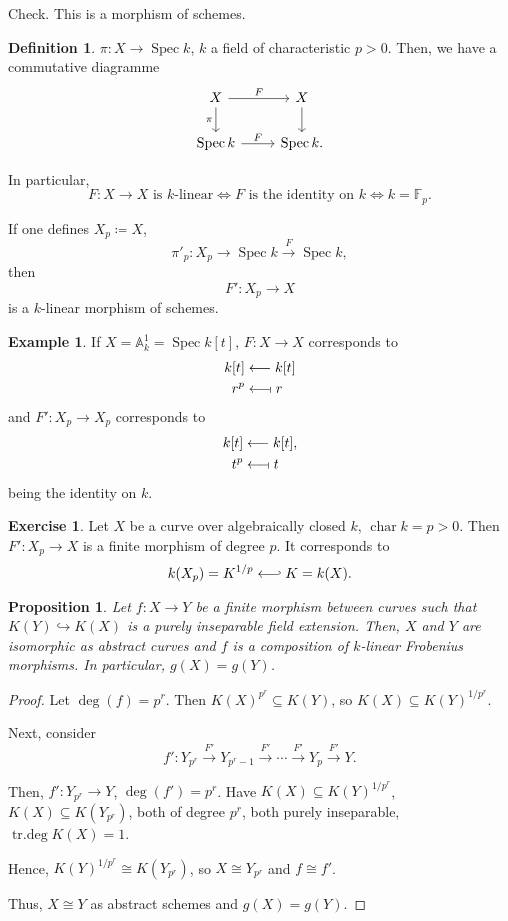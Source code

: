 \documentclass[12pt]{article}
\DeclareMathOperator{\Spec}{Spec}
\DeclareMathOperator{\chara}{char}
\DeclareMathOperator{\trdeg}{tr.deg}
\newtheorem*{proposition}{Proposition}
\theoremstyle{definition}
\newtheorem*{definition}{Definition}
\newtheorem*{exercise}{Exercise}
\newtheorem*{example}{Example}
\begin{document}
Check. This is a morphism of schemes.

\begin{definition}
$\pi:X\rightarrow\Spec k$, $k$ a field of characteristic $p>0$. Then, we have a commutative diagramme
\[\begin{tikzcd}X\arrow[r,"F"]\arrow[d,swap,"\pi"]&X\arrow[d]\\\Spec k\arrow[r,"F"]&\Spec k.\end{tikzcd}\]

In particular,
\[F:X\rightarrow X\text{ is }k\text{-linear}\Longleftrightarrow F\text{ is the identity on }k\Longleftrightarrow k=\mathbb F_p.\]

If one defines $X_p\coloneqq X$,
\[\pi'_p:X_p\longrightarrow\Spec k\overset F\longrightarrow\Spec k,\]
then
\[F':X_p\longrightarrow X\]
is a $k$-linear morphism of schemes.
\end{definition}

\begin{example}
If $X=\mathbb A_k^1=\Spec k[t]$, $F:X\rightarrow X$ corresponds to
\begin{align*}
k[t]&\longleftarrow k[t]\\r^p&\longleftarrow\!\shortmid r
\end{align*}
and $F':X_p\rightarrow X_p$ corresponds to
\begin{align*}
k[t]&\longleftarrow k[t],\\t^p&\longleftarrow\!\shortmid t
\end{align*}
being the identity on $k$.
\end{example}

\begin{exercise}
Let $X$ be a curve over algebraically closed $k$, $\chara k=p>0$. Then $F':X_p\rightarrow X$ is a finite morphism of degree $p$. It corresponds to
\[k(X_p)=K^{1/p}\longleftarrow\joinrel\rhook K=k(X).\]
\end{exercise}

\begin{proposition}
Let $f:X\rightarrow Y$ be a finite morphism between curves such that $K(Y)\hookrightarrow K(X)$ is a purely inseparable field extension. Then, $X$ and $Y$ are isomorphic as abstract curves and $f$ is a composition of $k$-linear Frobenius morphisms. In particular, $g(X)=g(Y)$.
\end{proposition}

\begin{proof}
Let $\deg(f)=p^r$. Then $K(X)^{p^r}\subseteq K(Y)$, so $K(X)\subseteq K(Y)^{1/p^r}$.

Next, consider
\[f':Y_{p^r}\overset{F'}\longrightarrow Y_{p^r-1}\overset{F'}\longrightarrow\cdots\overset{F'}\longrightarrow Y_p\overset{F'}\longrightarrow Y.\]

Then, $f':Y_{p^r}\rightarrow Y$, $\deg(f')=p^r$. Have $K(X)\subseteq K(Y)^{1/p^r}$, $K(X)\subseteq K(Y_{p^r})$, both of degree $p^r$, both purely inseparable, $\trdeg K(X)=1$.

Hence, $K(Y)^{1/p^r}\cong K(Y_{p^r})$, so $X\cong Y_{p^r}$ and $f\cong f'$.

Thus, $X\cong Y$ as abstract schemes and $g(X)=g(Y)$.
\end{proof}
\end{document}
